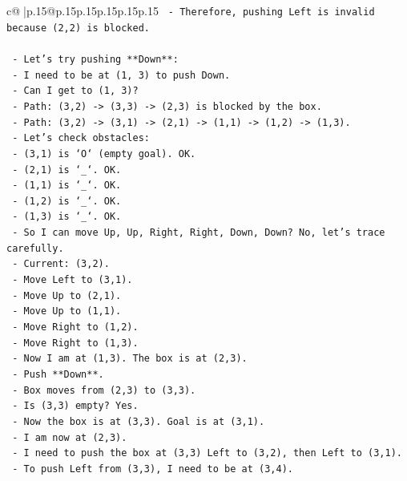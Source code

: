 \documentclass{article}
\begin{document}
{\begin{supertabular}{c@{$\;$}|p{.15\linewidth}@{}p{.15\linewidth}p{.15\linewidth}p{.15\linewidth}p{.15\linewidth}p{.15\linewidth}}
{{{\texttt{      {-} Therefore, pushing Left is invalid because (2,2) is blocked.} \\
\\ 
\texttt{    {-} Let's try pushing **Down**:} \\
\texttt{      {-} I need to be at (1, 3) to push Down.} \\
\texttt{      {-} Can I get to (1, 3)?} \\
\texttt{      {-} Path: (3,2) {-}> (3,3) {-}> (2,3) is blocked by the box.} \\
\texttt{      {-} Path: (3,2) {-}> (3,1) {-}> (2,1) {-}> (1,1) {-}> (1,2) {-}> (1,3).} \\
\texttt{      {-} Let's check obstacles:} \\
\texttt{        {-} (3,1) is `O` (empty goal). OK.} \\
\texttt{        {-} (2,1) is `\_`. OK.} \\
\texttt{        {-} (1,1) is `\_`. OK.} \\
\texttt{        {-} (1,2) is `\_`. OK.} \\
\texttt{        {-} (1,3) is `\_`. OK.} \\
\texttt{      {-} So I can move Up, Up, Right, Right, Down, Down? No, let's trace carefully.} \\
\texttt{      {-} Current: (3,2).} \\
\texttt{      {-} Move Left to (3,1).} \\
\texttt{      {-} Move Up to (2,1).} \\
\texttt{      {-} Move Up to (1,1).} \\
\texttt{      {-} Move Right to (1,2).} \\
\texttt{      {-} Move Right to (1,3).} \\
\texttt{      {-} Now I am at (1,3). The box is at (2,3).} \\
\texttt{      {-} Push **Down**.} \\
\texttt{      {-} Box moves from (2,3) to (3,3).} \\
\texttt{      {-} Is (3,3) empty? Yes.} \\
\texttt{      {-} Now the box is at (3,3). Goal is at (3,1).} \\
\texttt{      {-} I am now at (2,3).} \\
\texttt{      {-} I need to push the box at (3,3) Left to (3,2), then Left to (3,1).} \\
\texttt{      {-} To push Left from (3,3), I need to be at (3,4).} \\
}}}
\end{supertabular}}
\end{document}
